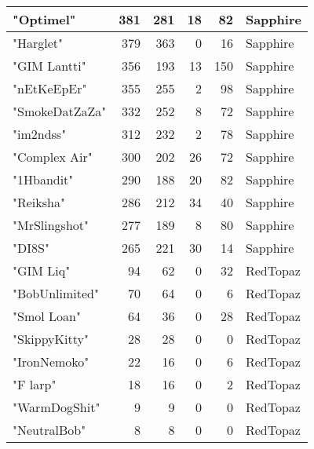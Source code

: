 \documentclass{article}
\begin{document}
\begin{table}[htbp]
\begin{tabular}{|l|r|r|r|r|l|}
"Optimel" & 381 & 281 & 18 & 82 & Sapphire \\ \hline
"Harglet" & 379 & 363 & 0 & 16 & Sapphire \\ \hline
"GIM Lantti" & 356 & 193 & 13 & 150 & Sapphire \\ \hline
"nEtKeEpEr" & 355 & 255 & 2 & 98 & Sapphire \\ \hline
"SmokeDatZaZa" & 332 & 252 & 8 & 72 & Sapphire \\ \hline
"im2ndss" & 312 & 232 & 2 & 78 & Sapphire \\ \hline
"Complex Air" & 300 & 202 & 26 & 72 & Sapphire \\ \hline
"1Hbandit" & 290 & 188 & 20 & 82 & Sapphire \\ \hline
"Reiksha" & 286 & 212 & 34 & 40 & Sapphire \\ \hline
"MrSlingshot" & 277 & 189 & 8 & 80 & Sapphire \\ \hline
"DI8S" & 265 & 221 & 30 & 14 & Sapphire \\ \hline
"GIM Liq" & 94 & 62 & 0 & 32 & RedTopaz \\ \hline
"BobUnlimited" & 70 & 64 & 0 & 6 & RedTopaz \\ \hline
"Smol Loan" & 64 & 36 & 0 & 28 & RedTopaz \\ \hline
"SkippyKitty" & 28 & 28 & 0 & 0 & RedTopaz \\ \hline
"IronNemoko" & 22 & 16 & 0 & 6 & RedTopaz \\ \hline
"F larp" & 18 & 16 & 0 & 2 & RedTopaz \\ \hline
"WarmDogShit" & 9 & 9 & 0 & 0 & RedTopaz \\ \hline
"NeutralBob" & 8 & 8 & 0 & 0 & RedTopaz \\ \hline
\end{tabular}
\end{table}
\end{document}
